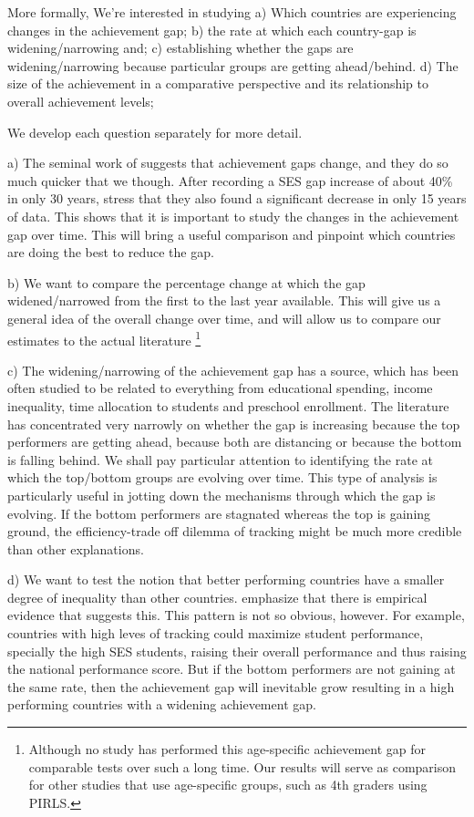 \documentclass[11pt, a4paper]{article}\usepackage[]{graphicx}\usepackage[]{color}
\begin{document}
More formally, We're interested in studying
a) Which countries are experiencing changes in the achievement gap;
b) the rate at which each country-gap is widening/narrowing and;
c) establishing whether the gaps are widening/narrowing because particular groups are getting ahead/behind.
d) The size of the achievement in a comparative perspective and its relationship to overall achievement levels;

We develop each question separately for more detail.

a) The seminal work of \citet{reardon2011} suggests that achievement gaps change, and they do so much quicker that we though. After recording a SES gap increase of about 40\% in only 30 years, \citep{reardon_portilla} stress that they also found a significant decrease in only 15 years of data. This shows that it is important to study the changes in the achievement gap over time. This will bring a useful comparison and pinpoint which countries are doing the best to reduce the gap.

b) We want to compare the percentage change at which the gap widened/narrowed from the first to the last year available. This will give us a general idea of the overall change over time, and will allow us to compare our estimates to the actual literature \footnote{Although no study has performed this age-specific achievement gap for comparable tests over such a long time. Our results will serve as comparison for other studies that use age-specific groups, such as 4th graders using PIRLS.}

c) The widening/narrowing of the achievement gap has a source, which has been often studied to be related to everything from educational spending, income inequality, time allocation to students and preschool enrollment. The literature has concentrated very narrowly on whether the gap is increasing because the top performers are getting ahead, because both are distancing or because the bottom is falling behind. We shall pay particular attention to identifying the rate at which the top/bottom groups are evolving over time. This type of analysis is particularly useful in jotting down the mechanisms through which the gap is evolving. If the bottom performers are stagnated whereas the top is gaining ground, the efficiency-trade off dilemma of tracking might be much more credible than other explanations.

d) We want to test the notion that better performing countries have a smaller degree of inequality than other countries. \citet{werfhorst_mijs} emphasize that there is empirical evidence that suggests this. This pattern is not so obvious, however. For example, countries with high leves of tracking could maximize student performance, specially the high SES students, raising their overall performance and thus raising the national performance score. But if the bottom performers are not gaining at the same rate, then the achievement gap will inevitable grow resulting in a high performing countries with a widening achievement gap.
\end{document}
